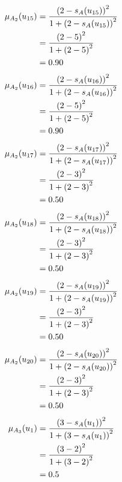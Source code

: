 \documentclass[a4paper,openany]{book}
\begin{document}
				\begin{align}
					\mu_{A_2}(u_{15}) &= \frac{\left(2-s_A(u_{15})\right)^2}{1 + \left(2-s_A(u_{15})\right)^2}\\
					&= \frac{\left(2-5\right)^2}{1 + \left(2-5\right)^2} \notag \\
					&= 0.90 \notag
				\end{align}
				\begin{align}
					\mu_{A_2}(u_{16}) &= \frac{\left(2-s_A(u_{16})\right)^2}{1 + \left(2-s_A(u_{16})\right)^2}\\
					&= \frac{\left(2-5\right)^2}{1 + \left(2-5\right)^2} \notag \\
					&= 0.90 \notag
				\end{align}
				\begin{align}
					\mu_{A_2}(u_{17}) &= \frac{\left(2-s_A(u_{17})\right)^2}{1 + \left(2-s_A(u_{17})\right)^2}\\
					&= \frac{\left(2-3\right)^2}{1 + \left(2-3\right)^2} \notag \\
					&= 0.50 \notag
				\end{align}
				\begin{align}
					\mu_{A_2}(u_{18}) &= \frac{\left(2-s_A(u_{18})\right)^2}{1 + \left(2-s_A(u_{18})\right)^2}\\
					&= \frac{\left(2-3\right)^2}{1 + \left(2-3\right)^2} \notag \\
					&= 0.50 \notag
				\end{align}
				\begin{align}
					\mu_{A_2}(u_{19}) &= \frac{\left(2-s_A(u_{19})\right)^2}{1 + \left(2-s_A(u_{19})\right)^2}\\
					&= \frac{\left(2-3\right)^2}{1 + \left(2-3\right)^2} \notag \\
					&= 0.50 \notag
				\end{align}
				\begin{align}
					\mu_{A_2}(u_{20}) &= \frac{\left(2-s_A(u_{20})\right)^2}{1 + \left(2-s_A(u_{20})\right)^2}\\
					&= \frac{\left(2-3\right)^2}{1 + \left(2-3\right)^2} \notag \\
					&= 0.50 \notag
				\end{align}
				\begin{align}
					\mu_{A_3}(u_1) &= \frac{\left(3-s_A(u_1)\right)^2}{1 + \left(3-s_A(u_1)\right)^2}\\
					&= \frac{\left(3-2\right)^2}{1 + \left(3-2\right)^2} \notag \\
					&= 0.5 \notag
				\end{align}
\end{document}
